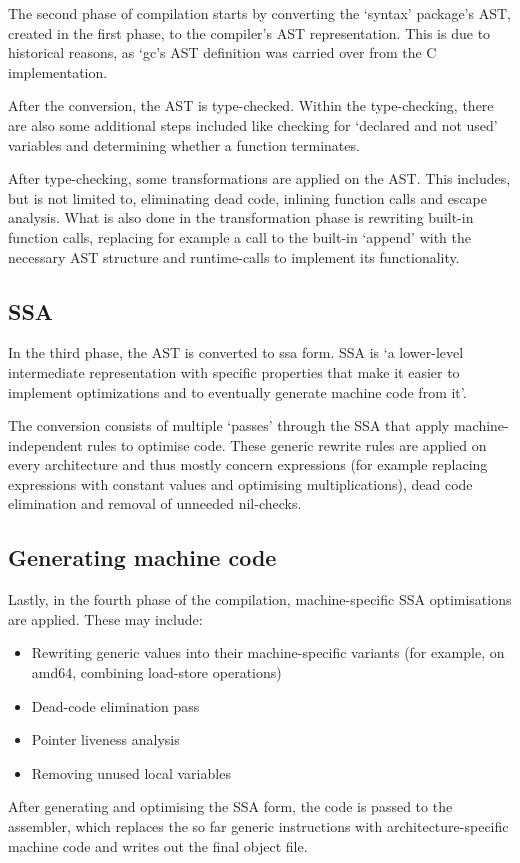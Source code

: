 The second phase of compilation starts by converting the `syntax' package's
AST, created in the first phase, to the compiler's AST representation. This
is due to historical reasons, as `gc's AST definition was carried over
from the C implementation.

After the conversion, the AST is type-checked. Within the type-checking, there
are also some additional steps included like checking for `declared and not used'
variables and determining whether a function terminates.

After type-checking, some transformations are applied on the AST. This includes,
but is not limited to, eliminating dead code, inlining function calls and escape
analysis. What is also done in the transformation phase is rewriting built-in function
calls, replacing for example a call to the built-in `append' with the necessary
AST structure and runtime-calls to implement its functionality.

\subsection{SSA}

In the third phase, the AST is converted to \gls{ssa} form. SSA  is `a
lower-level intermediate representation with specific properties that make it
easier to implement optimizations and to eventually generate machine code from
it'\autocite{compiler-readme}.

The conversion consists of multiple `passes' through the SSA that
apply machine-independent rules to optimise code. These generic
rewrite rules are applied on every architecture and thus mostly
concern expressions (for example replacing expressions with constant values and
optimising multiplications), dead code elimination and removal of unneeded
nil-checks.

\subsection{Generating machine code}

Lastly, in the fourth phase of the compilation, machine-specific
SSA optimisations are applied. These may include:
\begin{itemize}
    \item Rewriting generic values into their machine-specific variants
        (for example, on amd64, combining load-store operations)
    \item Dead-code elimination pass
    \item Pointer liveness analysis
    \item Removing unused local variables
\end{itemize}

After generating and optimising the SSA form, the code is passed to the
assembler, which replaces the so far generic instructions with
architecture-specific machine code and writes out the final object file\autocite{compiler-readme}.
